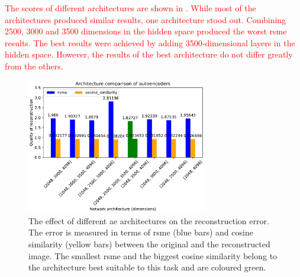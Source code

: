 \textcolor{red}{The scores of different architectures are shown in .
While most of the architectures produced similar results, one architecture stood out.
Combining 2500, 3000 and 3500 dimensions in the hidden space produced the worst \ac{rsme} results.
The best results were achieved by adding 3500-dimensional layers in the hidden space.
However, the results of the best architecture do not differ greatly from the others.}

\begin{figure}[h] %
    \centering
    \includegraphics[width=0.7\textwidth]{images/embeddings/autoencoder/ae_score_plot.pdf}
    \caption[Different \ac{ae} architectures and their reconstruction error]{The effect of different \ac{ae} architectures on the reconstruction error.
    The error is measured in terms of \ac{rsme} (blue bars) and cosine similarity (yellow bars) between the original and the reconstructed image.
    The smallest \ac{rsme} and the biggest cosine similarity belong to the architecture best suitable to this task and are coloured green.
    }
    \label{fig:eval-ae-architecture}
\end{figure}